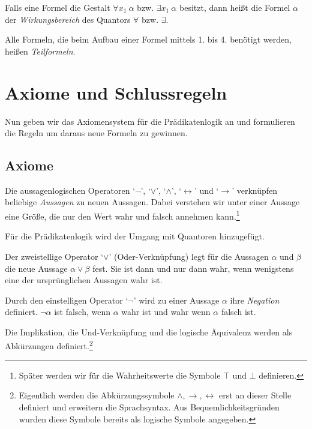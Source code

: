 \documentclass[a4paper,german,10pt,twoside]{book}
\theoremstyle{definition}
\theoremstyle{remark}
\begin{document}
\par
Falls eine Formel die Gestalt $\forall x_1 ~ \alpha$ bzw. 
$\exists x_1 ~ \alpha$ besitzt, dann hei{\ss}t die Formel $\alpha$ der
\emph{Wirkungsbereich} des Quantors $\forall$ bzw. $\exists$.

\par
Alle Formeln, die beim Aufbau einer Formel mittels 1. bis 4. ben{\"o}tigt
werden, hei{\ss}en \emph{Teilformeln}.



\chapter{Axiome und Schlussregeln} \label{chapter4} \hypertarget{chapter4}{}

Nun geben wir das Axiomensystem f{\"u}r die Pr{\"a}dikatenlogik an und formulieren die Regeln um daraus neue Formeln zu gewinnen.

\section{Axiome} \label{chapter4_section0} \hypertarget{chapter4_section0}{}
Die aussagenlogischen Operatoren
\mbox{`$\neg$'}, \mbox{`$\vee$'}, \mbox{`$\wedge$'}, 
\mbox{`$\leftrightarrow$'} und \mbox{`$\rightarrow$'}
verkn{\"u}pfen beliebige \emph{Aussagen} zu neuen Aussagen.
Dabei verstehen wir unter einer Aussage eine Gr{\"o}{\ss}e,
die nur den Wert {\glqq wahr\grqq} und {\glqq falsch\grqq}
annehmen kann.\footnote{Sp{\"a}ter werden wir f{\"u}r die Wahrheitswerte
die Symbole $\top$ und $\bot$ definieren.}

F{\"u}r die Pr{\"a}dikatenlogik wird der Umgang mit Quantoren hinzugef{\"u}gt.

Der zweistellige Operator \mbox{`$\vee$'} (Oder-Verkn{\"u}pfung) legt
f{\"u}r die Aussagen $\alpha$ und $\beta$ die neue Aussage 
$\alpha \vee \beta$ fest. Sie ist dann und nur dann wahr, wenn 
wenigstens eine der urspr{\"u}nglichen Aussagen wahr ist.

\par
Durch den einstelligen Operator \mbox{`$\neg$'} wird zu einer Aussage
$\alpha$ ihre \emph{Negation} definiert. $\neg \alpha$ ist falsch,
wenn $\alpha$ wahr ist und wahr wenn $\alpha$ falsch ist.
            
\par
Die Implikation, die Und-Verkn{\"u}pfung und die logische {\"A}quivalenz werden als 
Abk{\"u}rzungen definiert.\footnote{Eigentlich werden die 
Abk{\"u}rzungssymbole $\wedge, \rightarrow, \leftrightarrow$ erst an 
dieser Stelle definiert und erweitern die Sprachsyntax. Aus 
Bequemlichkeitsgr{\"u}nden wurden diese Symbole bereits als logische 
Symbole angegeben.}
\end{document}
